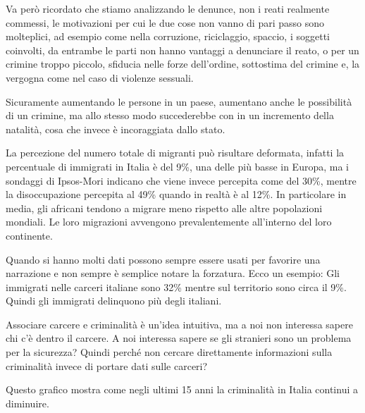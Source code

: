 \documentclass[12pt]{book} %
\begin{document}
Va però ricordato che stiamo analizzando le denunce, non i reati realmente commessi, le motivazioni per cui le due cose
non vanno di pari passo sono molteplici, ad esempio come nella corruzione, riciclaggio, spaccio, i soggetti coinvolti,
da entrambe le parti non hanno vantaggi a denunciare il reato, o per un crimine troppo piccolo, sfiducia nelle forze
dell'ordine, sottostima del crimine e, la vergogna come nel caso di violenze sessuali.

Sicuramente aumentando le persone
in un paese, aumentano anche le possibilità di un crimine, ma allo stesso modo succederebbe con in un incremento della
natalità, cosa che invece è incoraggiata dallo stato.

La percezione del numero totale di migranti può risultare deformata, infatti la percentuale di immigrati in Italia è del 9\%, una delle più basse in Europa, ma i sondaggi di Ipsos-Mori indicano che viene invece percepita come del 30\%, mentre la disoccupazione percepita al 49\% quando
in realtà è al 12\%.
In particolare in media, gli africani tendono a migrare meno rispetto alle altre popolazioni mondiali. Le loro migrazioni avvengono prevalentemente all'interno del loro continente.

Quando si hanno molti dati possono sempre essere usati per favorire una narrazione e non sempre è semplice notare la forzatura.
Ecco un esempio: Gli immigrati nelle carceri italiane sono 32\% mentre sul territorio sono circa il 9\%. Quindi gli immigrati delinquono più degli italiani.

Associare carcere e criminalità è un'idea intuitiva, ma a noi non interessa sapere chi c'è dentro il carcere. A noi interessa sapere se gli stranieri sono un problema per la sicurezza? Quindi perché non cercare direttamente informazioni sulla criminalità invece di portare dati sulle carceri?

Questo grafico mostra come negli ultimi 15 anni la criminalità in Italia continui a diminuire.

\bigskip
\end{document}
